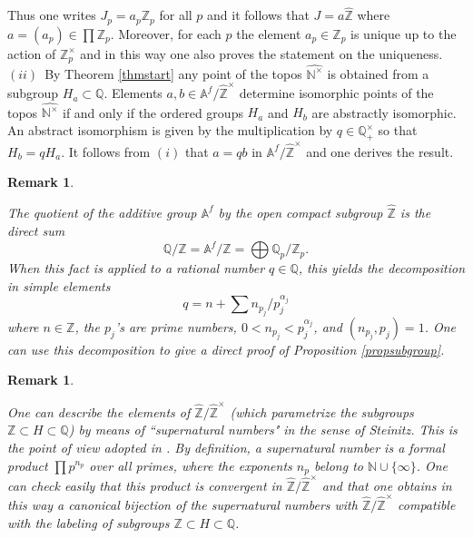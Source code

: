 \documentclass[noams,lp]{compositio}
\newtheorem{rem}[thm]{Remark}
\def\A{{\mathbb A}}
\def\N{{\mathbb N}}
\def\Q{{\mathbb Q}}
\def\Z{{\mathbb Z}}
\def\wnt{{\widehat{\N^{\times}}}}
\def\hatz{{\hat\Z^\times}}
\begin{document}
Thus one writes $J_p=a_p\Z_p$ for all $p$ and  it follows that $J=a\hat\Z$ where $a=(a_p)\in \prod\Z_p$. Moreover, for each $p$ the element $a_p\in\Z_p$ is unique up to the action of $\Z_p^\times$ and in this way one also proves the statement on the uniqueness.\newline
$(ii)$~By Theorem \ref{thmstart} any point of the topos $\wnt$ is obtained from a subgroup $H_a\subset \Q$. Elements $a,b\in \A^f/\hatz$ determine isomorphic points of the topos $\widehat{ \N^\times} $
if and only if the ordered groups $H_a$ and $H_b$ are abstractly isomorphic. An abstract isomorphism is given by the multiplication by  $q\in \Q_+^\times$ so that $H_b=qH_a$. It follows from $(i)$ that $a=qb$ in $\A^f/\hatz$ and one derives the result. \endproof

\begin{rem}\label{natnum}{\rm 

The quotient of the additive group $\A^f$ by the open compact subgroup $\hat\Z$ is the direct sum
$$
\Q/\Z=\A^f/\hat \Z= \bigoplus \Q_p/\Z_p.
$$
When this fact is applied to a rational number $q\in \Q$, this yields the decomposition in simple elements
\begin{equation}\label{decsimple}
q=n+
\sum  n_{p_j}/p_j^{\alpha_j}
\end{equation} 
where $n\in \Z$, the $p_j$'s are prime numbers, $0<n_{p_j}<p_j^{\alpha_j}$, and $(n_{p_j},p_j)=1$. One can use this decomposition to give a direct proof of Proposition \ref{propsubgroup}.
}\end{rem}

\begin{rem}\label{natnum1}{\rm 

One can describe the elements of $\hat \Z/\hat \Z^\times$ (which parametrize the subgroups $\Z\subset H\subset \Q$) by means of ``supernatural numbers" in the sense of Steinitz. This is the point of view adopted in \cite{Dixmier, LB}. By definition, a supernatural number is a formal product $\prod p^{n_p}$ over all primes, where the exponents $n_p$ belong to $\N\cup \{\infty\}$. One can check easily that this product is convergent in $\hat \Z/\hat \Z^\times$ and that one obtains in this way a canonical bijection of the supernatural numbers with $\hat \Z/\hat \Z^\times$ compatible with the labeling of subgroups $\Z\subset H\subset \Q$.
}\end{rem}
\end{document}
